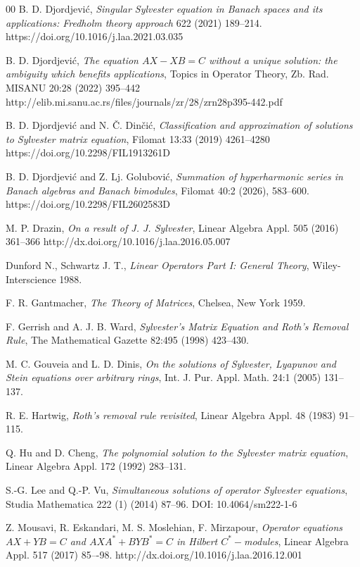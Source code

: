 \documentclass{article}
\theoremstyle{definition}
\begin{document}
\begin{thebibliography}{00}
 B. D. Djordjevi\'c, {\it Singular Sylvester equation in Banach spaces and its applications: Fredholm theory approach} 622 (2021) 189--214. https://doi.org/10.1016/j.laa.2021.03.035

 B. D. Djordjevi\'c, {\it The equation $AX-XB=C$ without a unique solution: the ambiguity which benefits applications}, Topics in Operator Theory,  Zb. Rad. MISANU 20:28 (2022) 395--442
http://elib.mi.sanu.ac.rs/files/journals/zr/28/zrn28p395-442.pdf

 B. D. Djordjevi\'c and  N. \v C. Din\v ci\'c, {\it Classification and approximation of solutions to Sylvester matrix equation}, Filomat 13:33 (2019) 4261--4280
https://doi.org/10.2298/FIL1913261D

 B. D. Djordjevi\'c and  Z. Lj. Golubovi\'c, {\it Summation of hyperharmonic series in Banach algebras and Banach
bimodules}, Filomat 40:2 (2026), 583–600. https://doi.org/10.2298/FIL2602583D

 M. P. Drazin, {\it On a result of J. J. Sylvester}, Linear Algebra Appl. 505 (2016) 361--366 http://dx.doi.org/10.1016/j.laa.2016.05.007

 Dunford N., Schwartz J. T., {\it Linear Operators Part I: General Theory}, Wiley-Interscience 1988.

 F. R. Gantmacher, {\it The Theory of Matrices}, Chelsea, New York 1959.

 F. Gerrish and A. J. B. Ward, {\it Sylvester's Matrix Equation and Roth's Removal Rule}, The Mathematical Gazette 82:495 (1998) 423--430.

 M. C. Gouveia and L. D. Dinis, {\it On the solutions of Sylvester, Lyapunov and Stein equations over arbitrary rings}, Int. J. Pur. Appl. Math. 24:1 (2005) 131--137.

 R. E. Hartwig, {\it Roth's removal rule revisited}, Linear Algebra Appl. 48 (1983) 91--115.

 Q. Hu and D. Cheng, {\it The polynomial solution to the Sylvester matrix equation}, Linear Algebra Appl. 172 (1992) 283--131.

 S.-G. Lee and Q.-P. Vu, {\it Simultaneous solutions of operator Sylvester equations}, Studia Mathematica 222 (1) (2014) 87--96. DOI: 10.4064/sm222-1-6

 Z. Mousavi, R. Eskandari, M. S. Moslehian, F. Mirzapour, {\it Operator equations $AX+YB=C$ and $AXA^*+BYB^*=C$ in Hilbert $C^*-$modules}, Linear Algebra Appl. 517 (2017) 85–-98. http://dx.doi.org/10.1016/j.laa.2016.12.001


\end{thebibliography}
\end{document}
